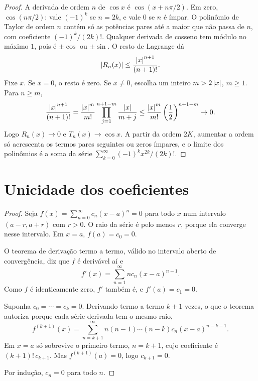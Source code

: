 \documentclass[11pt,a4paper]{article}
\begin{document}
\begin{proof}
A derivada de ordem \(n\) de \(\cos x\) é \(\cos(x+n\pi/2)\). Em zero, \(\cos(n\pi/2)\): vale \((-1)^k\) se \(n=2k\), e vale \(0\) se \(n\) é ímpar. O polinômio de Taylor de ordem \(n\) contém só as potências pares até a maior que não passa de \(n\), com coeficiente \((-1)^k/(2k)!\). Qualquer derivada de cosseno tem módulo no máximo \(1\), pois é \(\pm\cos\) ou \(\pm\sin\). O resto de Lagrange dá
\[
\left\lvert R_n(x) \right\rvert\le\frac{\left\lvert x \right\rvert^{n+1}}{(n+1)!}.
\]
Fixe \(x\). Se \(x=0\), o resto é zero. Se \(x\neq 0\), escolha um inteiro \(m>2\left\lvert x \right\rvert\), \(m\ge 1\). Para \(n\ge m\),
\[
\frac{\left\lvert x \right\rvert^{n+1}}{(n+1)!}
=\frac{\left\lvert x \right\rvert^m}{m!}\prod_{j=1}^{n+1-m}\frac{\left\lvert x \right\rvert}{m+j}
\le\frac{\left\lvert x \right\rvert^m}{m!}\left(\frac{1}{2}\right)^{n+1-m}\to 0.
\]
Logo \(R_n(x)\to 0\) e \(T_n(x)\to\cos x\). A partir da ordem \(2K\), aumentar a ordem só acrescenta os termos pares seguintes ou zeros ímpares, e o limite dos polinômios é a soma da série \(\sum_{k=0}^\infty (-1)^k x^{2k}/(2k)!\).
\end{proof}

\section{Unicidade dos coeficientes}

\begin{proof}
Seja \(f(x)=\sum_{n=0}^\infty c_n(x-a)^n=0\) para todo \(x\) num intervalo \((a-r,a+r)\) com \(r>0\). O raio da série é pelo menos \(r\), porque ela converge nesse intervalo. Em \(x=a\), \(f(a)=c_0=0\).

O teorema de derivação termo a termo, válido no intervalo aberto de convergência, diz que \(f\) é derivável aí e
\[
f'(x)=\sum_{n=1}^\infty n c_n(x-a)^{n-1}.
\]
Como \(f\) é identicamente zero, \(f'\) também é, e \(f'(a)=c_1=0\).

Suponha \(c_0=\cdots=c_k=0\). Derivando termo a termo \(k+1\) vezes, o que o teorema autoriza porque cada série derivada tem o mesmo raio,
\[
f^{(k+1)}(x)=\sum_{n=k+1}^\infty n(n-1)\cdots(n-k)c_n(x-a)^{n-k-1}.
\]
Em \(x=a\) só sobrevive o primeiro termo, \(n=k+1\), cujo coeficiente é \((k+1)!\,c_{k+1}\). Mas \(f^{(k+1)}(a)=0\), logo \(c_{k+1}=0\).

Por indução, \(c_n=0\) para todo \(n\).
\end{proof}
\end{document}
